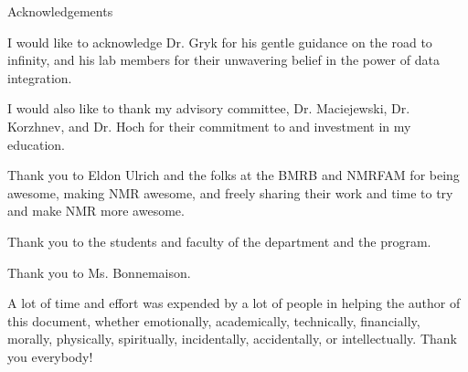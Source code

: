 \newpage
\begin{center}
  \Large
  Acknowledgements
\end{center}

I would like to acknowledge Dr. Gryk for his gentle guidance on 
the road to infinity, and his lab members for their unwavering belief
in the power of data integration.

I would also like to thank my advisory committee, Dr. Maciejewski, Dr. Korzhnev,
and Dr. Hoch for their commitment to and investment in my education. 

Thank you to Eldon Ulrich and the folks at the BMRB and NMRFAM for being 
awesome, making NMR awesome, and freely sharing their work and time to try
and make NMR more awesome.

Thank you to the students and faculty of the department and the program.

Thank you to Ms. Bonnemaison.

A lot of time and effort was expended by a lot of people in helping
the author of this document, whether emotionally, academically, 
technically, financially, morally, physically, spiritually, 
incidentally, accidentally, or intellectually.
Thank you everybody!

